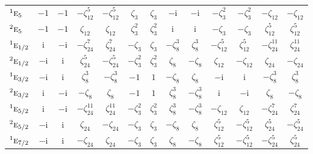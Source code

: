 \documentclass[10pt,a4paper]{article}
\makeatletter
\def\grouprule#1#2{\noalign{\marks\LTgroupmarks{\the\belowrulesep}\nobreak\vskip#1%
  \vskip\aboverulesep}\multispan\LT@cols\unskip{\leaders\hrule\@height#2\hfill\kern\z@}\cr
  \noalign{\penalty\LTrulebreak\vskip\belowrulesep\global\@lastruleclass\z@}}
\numberwithin{equation}{section}
\newcommand{\irr}[1]{\text{\normalfont\scshape #1}}
\newcommand{\conjpair}[1]{{}^{#1}}
\newcommand{\iunit}{\mathrm{i}}
\newcommand{\rootunity}[1]{\zeta_{#1}}
\makeatother
\begin{document}
{\begin{longtable}{@{}lcccccccccccc@{}}
$\conjpair{1}\irr{e}_{5}$ & $-1$ & $-1$ & $-\rootunity{12}^{5}$ & $-\rootunity{12}^{5}$ & $\rootunity{3}$ & $\rootunity{3}$ & $-\iunit{}$ & $-\iunit{}$ & $-\rootunity{3}^{2}$ & $-\rootunity{3}^{2}$ & $-\rootunity{12}$ & $-\rootunity{12}$\\
$\conjpair{2}\irr{e}_{5}$ & $-1$ & $-1$ & $\rootunity{12}$ & $\rootunity{12}$ & $\rootunity{3}^{2}$ & $\rootunity{3}^{2}$ & $\iunit{}$ & $\iunit{}$ & $-\rootunity{3}$ & $-\rootunity{3}$ & $\rootunity{12}^{5}$ & $\rootunity{12}^{5}$\\
\grouprule{0pt}{\lightrulewidth}
$\conjpair{1}\irr{e}_{1/2}$ & $\iunit{}$ & $-\iunit{}$ & $-\rootunity{24}^{7}$ & $\rootunity{24}^{7}$ & $-\rootunity{3}$ & $\rootunity{3}$ & $-\rootunity{8}^{3}$ & $\rootunity{8}^{3}$ & $-\rootunity{12}^{5}$ & $\rootunity{12}^{5}$ & $-\rootunity{24}^{11}$ & $\rootunity{24}^{11}$\\
$\conjpair{2}\irr{e}_{1/2}$ & $-\iunit{}$ & $\iunit{}$ & $\rootunity{24}^{5}$ & $-\rootunity{24}^{5}$ & $-\rootunity{3}^{2}$ & $\rootunity{3}^{2}$ & $\rootunity{8}$ & $-\rootunity{8}$ & $\rootunity{12}$ & $-\rootunity{12}$ & $\rootunity{24}$ & $-\rootunity{24}$\\
$\conjpair{1}\irr{e}_{3/2}$ & $-\iunit{}$ & $\iunit{}$ & $\rootunity{8}^{3}$ & $-\rootunity{8}^{3}$ & $-1$ & $1$ & $-\rootunity{8}$ & $\rootunity{8}$ & $-\iunit{}$ & $\iunit{}$ & $-\rootunity{8}^{3}$ & $\rootunity{8}^{3}$\\
$\conjpair{2}\irr{e}_{3/2}$ & $\iunit{}$ & $-\iunit{}$ & $-\rootunity{8}$ & $\rootunity{8}$ & $-1$ & $1$ & $\rootunity{8}^{3}$ & $-\rootunity{8}^{3}$ & $\iunit{}$ & $-\iunit{}$ & $\rootunity{8}$ & $-\rootunity{8}$\\
$\conjpair{1}\irr{e}_{5/2}$ & $\iunit{}$ & $-\iunit{}$ & $-\rootunity{24}^{11}$ & $\rootunity{24}^{11}$ & $-\rootunity{3}^{2}$ & $\rootunity{3}^{2}$ & $\rootunity{8}^{3}$ & $-\rootunity{8}^{3}$ & $-\rootunity{12}$ & $\rootunity{12}$ & $-\rootunity{24}^{7}$ & $\rootunity{24}^{7}$\\
$\conjpair{2}\irr{e}_{5/2}$ & $-\iunit{}$ & $\iunit{}$ & $\rootunity{24}$ & $-\rootunity{24}$ & $-\rootunity{3}$ & $\rootunity{3}$ & $-\rootunity{8}$ & $\rootunity{8}$ & $\rootunity{12}^{5}$ & $-\rootunity{12}^{5}$ & $\rootunity{24}^{5}$ & $-\rootunity{24}^{5}$\\
$\conjpair{1}\irr{e}_{7/2}$ & $-\iunit{}$ & $\iunit{}$ & $-\rootunity{24}$ & $\rootunity{24}$ & $-\rootunity{3}$ & $\rootunity{3}$ & $\rootunity{8}$ & $-\rootunity{8}$ & $\rootunity{12}^{5}$ & $-\rootunity{12}^{5}$ & $-\rootunity{24}^{5}$ & $\rootunity{24}^{5}$\\

\end{longtable}}
\end{document}
